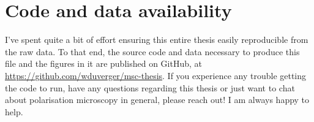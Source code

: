 \chapter{Code and data availability}

I've spent quite a bit of effort ensuring this entire thesis easily reproducible from the raw data. To that end, the source code and data necessary to produce this file and the figures in it are published on GitHub, at \url{https://github.com/wduverger/msc-thesis}. 
If you experience any trouble getting the code to run, have any questions regarding this thesis or just want to chat about polarisation microscopy in general, please reach out! I am always happy to help.